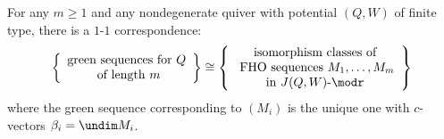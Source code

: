 \begin{theo}\label{thm: inductive thm implying main thm}
For any $m\ge1$ and any nondegenerate quiver with potential $(Q,W)$ of finite type, there is a $1$-$1$ correspondence:
\[
\left\{\begin{array}{c}
\text{green sequences for $Q$}\\
\text{ of length $m$}
\end{array}
\right\}\cong 
\left\{
\begin{array}{c}
\text{isomorphism classes of}\\
\text{ FHO sequences $M_1,\ldots,M_m$}\\
\text{in $J(Q,W)\text{-}\modr $}
\end{array}
\right\}
\]
where the green sequence corresponding to $(M_i)$ is the unique one with $c$-vectors $\beta_i=\undim M_i$.
\end{theo}
